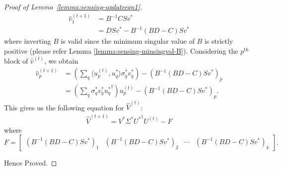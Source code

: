 \documentclass[11pt]{article}
\theoremstyle{plain}
\theoremstyle{definition}
\newcommand{\iprod}[2]{\langle #1, #2 \rangle}
\begin{document}
\begin{proof}[Proof of Lemma~\ref{lemma:sensing-updateeqn1}]
\begin{align*}
   \widehat{v}_1^{(t+1)}&= B^{-1}CSv^* \\
	&= DSv^* - B^{-1}\left(BD-C\right)Sv^*
\end{align*}
where inverting $B$ is valid since the minimum singular value of $B$ is strictly positive (please refer Lemma
\ref{lemma:sensing-minsingval-B}). Considering the $p^{\textrm{th}}$ block of $\widehat{v}^{(t)}$, we obtain
\begin{align*}
  \widehat{v}_p^{(t+1)} &= \left(\sum_q \iprod{u_p^{(t)}}{u_q^*} \sigma_q^*v_q^*\right) - \left(B^{-1}\left(BD-C\right)Sv^*\right)_p \\
	&= \left(\sum_q \sigma_q^*v_q^* {u_q^*}^\dag  \right)u_p^{(t)} - \left(B^{-1}\left(BD-C\right)Sv^*\right)_p.
\end{align*}
This gives us the following equation for $\widehat{V}^{(t)}$:
\begin{align*}
  \widehat{V}^{(t+1)} = V^*\Sigma^*{U^*}^\dag  U^{(t)} - F
\end{align*}
where $F =\left[ \begin{array}{cccc}
\left(B^{-1}\left(BD-C\right)Sv^*\right)_1 & \left(B^{-1}\left(BD-C\right)Sv^*\right)_2
& \cdots & \left(B^{-1}\left(BD-C\right)Sv^*\right)_k
\end{array} \right].$
 
Hence Proved.
\end{proof}
\end{document}
